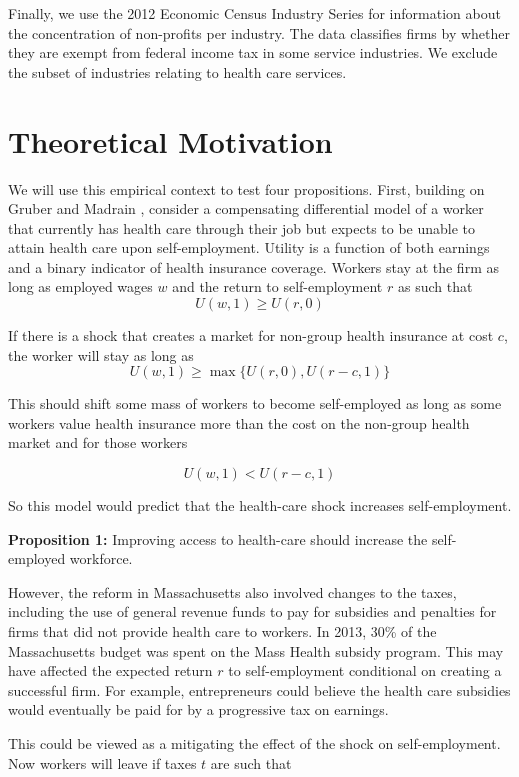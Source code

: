\documentclass[12pt]{article}
\begin{document}
Finally, we use the 2012 Economic Census Industry Series for information about the concentration of non-profits per industry. The data classifies firms by whether they are exempt from federal income tax in some service industries. We exclude the subset of industries relating to health care services.

\section{Theoretical Motivation}

We will use this empirical context to test four propositions. First, building on Gruber and Madrain \cite{gm2002}, consider a compensating differential model of a worker that currently has health care through their job but expects to be unable to attain health care upon self-employment. Utility is a function of both earnings and a binary indicator of health insurance coverage. Workers stay at the firm as long as employed wages $w$ and the return to self-employment $r$ as such that
$$U(w,1) \ge U(r,0)$$

If there is a shock that creates a market for non-group health insurance at cost $c$, the worker will stay as long as
$$U(w,1) \ge \max\{U(r,0),U(r-c,1)\}$$

This should shift some mass of workers to become self-employed as long as some workers value health insurance more than the cost on the non-group health market and for those workers

$$U(w,1) < U(r-c,1)$$

So this model would predict that the health-care shock increases self-employment. 

\textbf{Proposition 1:} 
Improving access to health-care should increase the self-employed workforce. 

However, the reform in Massachusetts also involved changes to the taxes, including the use of general revenue funds to pay for subsidies and penalties for firms that did not provide health care to workers. In 2013, 30\% of the Massachusetts budget was spent on the Mass Health \cite{masshealth} subsidy program. This may have affected the expected  return $r$ to self-employment conditional on creating a successful firm. For example, entrepreneurs could believe the health care subsidies would eventually be paid for by a progressive tax on earnings.

This could be viewed as a mitigating the effect of the shock on self-employment. Now workers will leave if taxes $t$ are such that
\end{document}

